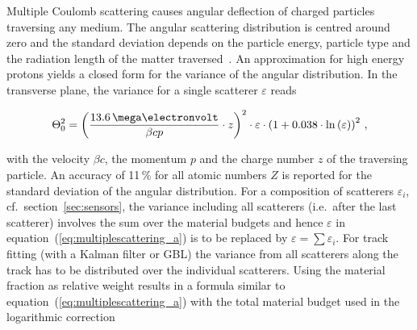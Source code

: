 % 
%
%
%
%
%
Multiple Coulomb scattering causes angular deflection of charged particles traversing any medium.
The angular scattering distribution is centred around zero
 and the standard deviation depends on the particle energy, particle type and the radiation length of the matter traversed~\cite{ref:scatteringhighland}.
An approximation for high energy protons yields a closed form for the variance of the angular distribution. 
In the transverse plane, the variance for a single scatterer $\varepsilon$ reads~\cite{ref:PDG-2014}

\begin{equation}
\label{eq:multiplescattering_a}
\Theta_{0}^{2} = \left( \frac{13.6\,\mega\electronvolt}{\beta c p} \cdot z \right)^2
\cdot \varepsilon
\cdot \left( 1 + 0.038 \cdot \ln{\left( \varepsilon \right) } \right)^2 \,,
\end{equation}

\noindent with the velocity $\beta c$, the momentum $p$ and the charge number $z$ of the traversing particle. 
An accuracy of 11\,\% for all atomic numbers $Z$ is reported for the standard deviation of the angular distribution. 
For a composition of scatterers $\varepsilon_i$, cf.\ section~\ref{sec:sensors}, the variance including all scatterers (i.e.\ after the last scatterer)
 involves the sum over the material budgets and hence $\varepsilon$ in equation~(\ref{eq:multiplescattering_a}) is to be replaced by $\varepsilon = \sum \varepsilon_i$. 
For track fitting (with a Kalman filter or GBL) the variance from all scatterers along the track has to be distributed over the individual scatterers. 
Using the material fraction as relative weight results in a formula similar to equation~(\ref{eq:multiplescattering_a})
 with the total material budget used in the logarithmic correction

